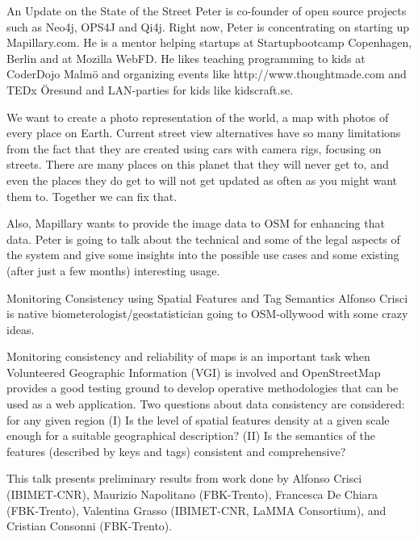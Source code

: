 %
{An Update on the State of the Street}%
{Peter is co-founder of open source projects such as Neo4j, OPS4J and Qi4j. Right now, Peter is concentrating on starting up Mapillary.com. He is a mentor helping startups at Startupbootcamp Copenhagen, Berlin and at Mozilla WebFD. He likes teaching programming to kids at CoderDojo Malmö and organizing events like http://www.thoughtmade.com and TEDx Öresund and LAN-parties for kids like kidscraft.se.}%
{We want to create a photo representation of the world, a map with photos of every place on Earth. Current street view alternatives have so many limitations from the fact that they are created using cars with camera rigs, focusing on streets. There are many places on this planet that they will never get to, and even the places they do get to will not get updated as often as you might want them to. Together we can fix that. 

Also, Mapillary wants to provide the image data to OSM for enhancing that data. 
Peter is going to talk about the technical and some of the legal aspects of the system and give some insights into the possible use cases and some existing (after just a few months) interesting usage.}

%
{Monitoring Consistency using Spatial Features and Tag Semantics}%
{Alfonso Crisci is native biometerologist/geostatistician going to OSM-ollywood with some crazy ideas.}%
{Monitoring consistency and reliability of maps is an important task when Volunteered Geographic Information (VGI) is involved and OpenStreetMap provides a good testing ground to develop operative methodologies that can be used as a web application. Two questions about data consistency are considered: for any given region (I) Is the level of spatial features density at a given scale enough for a suitable geographical description? (II) Is the semantics of the features (described by keys and tags) consistent and comprehensive?

This talk presents preliminary results from work done by Alfonso Crisci (IBIMET-CNR), Maurizio Napolitano (FBK-Trento), Francesca De Chiara (FBK-Trento), Valentina Grasso (IBIMET-CNR, LaMMA Consortium), and Cristian Consonni (FBK-Trento).}

